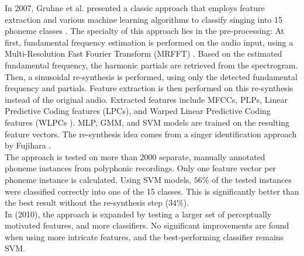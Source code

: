 In 2007, Gruhne et al. presented a classic approach that employs feature extraction and various machine learning algorithms to classify singing into 15 phoneme classes \cite{Gruhne2007} \cite{Gruhne2007a}. The specialty of this approach lies in the pre-processing: At first, fundamental frequency estimation is performed on the audio input, using a Multi-Resolution Fast Fourier Transform (MRFFT) \cite{inproceedings:dressler}. Based on the estimated fundamental frequency, the harmonic partials are retrieved from the spectrogram. Then, a sinusoidal re-synthesis is performed, using only the detected fundamental frequency and partials. Feature extraction is then performed on this re-synthesis instead of the original audio. Extracted features include MFCCs, PLPs, Linear Predictive Coding features (LPCs), and Warped Linear Predictive Coding features (WLPCs \cite{lpc}). MLP, GMM, and SVM models are trained on the resulting feature vectors. The re-synthesis idea comes from a singer identification approach by Fujihara \cite{fujihara_identification}.\\
The approach is tested on more than 2000 separate, manually annotated phoneme instances from polyphonic recordings. Only one feature vector per phoneme instance is calculated. Using SVM models, $56\%$ of the tested instances were classified correctly into one of the 15 classes. This is significantly better than the best result without the re-synthesis step ($34\%$).\\
In \cite{szepannek} (2010), the approach is expanded by testing a larger set of perceptually motivated features, and more classifiers. No significant improvements are found when using more intricate features, and the best-performing classifier remains SVM.\\

